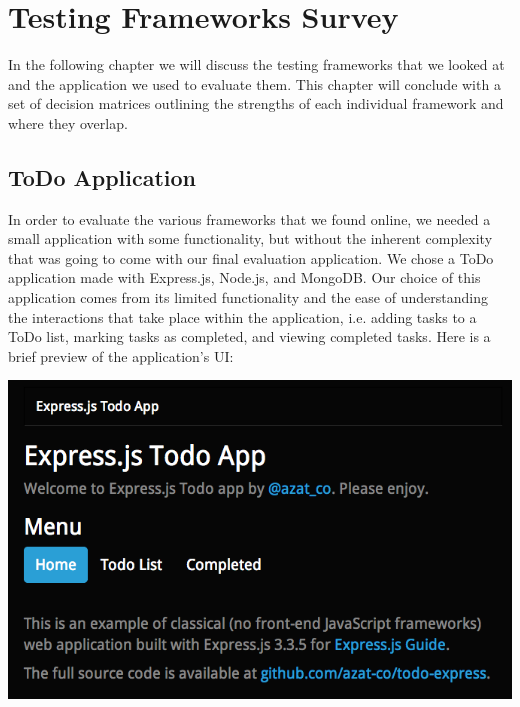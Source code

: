 \documentclass[12pt]{ucthesis}
\newenvironment{Figure}
  {\par\medskip\noindent\minipage{\linewidth}}
  {\endminipage\par\medskip}
\begin{document}
\chapter{Testing Frameworks Survey}
In the following chapter we will discuss the testing frameworks that we looked at and the application we used to evaluate them. This chapter will conclude with a set of decision matrices outlining the strengths of each individual framework and where they overlap.

\section{ToDo Application}
In order to evaluate the various frameworks that we found online, we needed a small application with some functionality, but without the inherent complexity that was going to come with our final evaluation application. We chose a ToDo application made with Express.js, Node.js, and MongoDB\cite{ToDoAppHomePage}. Our choice of this application comes from its limited functionality and the ease of understanding the interactions that take place within the application, i.e. adding tasks to a ToDo list, marking tasks as completed, and viewing completed tasks. Here is a brief preview of the application's UI:

\begin{Figure}
  \centering
  \includegraphics[width=0.75\linewidth]{todo_home.png}
  
  
\end{Figure}
\end{document}
